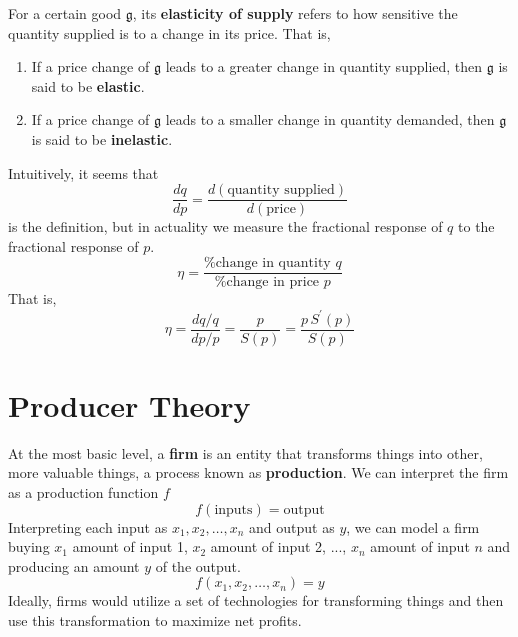 \documentclass{article}
\begin{document}
      \begin{definition}
        \label{def:price-elasticity-of-supply}
        For a certain good $\mathfrak{g}$, its \textbf{elasticity of supply} refers to how sensitive the quantity supplied is to a change in its price. That is, 
        \begin{enumerate}
          \item If a price change of $\mathfrak{g}$ leads to a greater change in quantity supplied, then $\mathfrak{g}$ is said to be \textbf{elastic}. 
          \item If a price change of $\mathfrak{g}$ leads to a smaller change in quantity demanded, then $\mathfrak{g}$ is said to be \textbf{inelastic}. 
        \end{enumerate}
        Intuitively, it seems that 
        \begin{equation}
          \frac{d q}{d p} = \frac{d (\text{quantity supplied})}{d (\text{price})}
        \end{equation}
        is the definition, but in actuality we measure the fractional response of $q$ to the fractional response of $p$. 
        \begin{equation}
          \eta = \frac{\text{\% change in quantity } q}{\text{\% change in price } p}
        \end{equation}
        That is, 
        \begin{equation}
          \eta = \frac{dq/q}{dp/p} = \frac{p}{S(p)} = \frac{p \, S^\prime (p)}{S(p)}
        \end{equation}
      \end{definition}

\section{Producer Theory}

  \begin{definition}
    \label{def:firm-as-a-production-function}
    At the most basic level, a \textbf{firm} is an entity that transforms things into other, more valuable things, a process known as \textbf{production}. We can interpret the firm as a production function $f$ 
    \begin{equation}
      f(\text{inputs}) = \text{output}
    \end{equation}
    Interpreting each input as $x_1, x_2, \ldots, x_n$ and output as $y$, we can model a firm buying $x_1$ amount of input 1, $x_2$ amount of input 2, ..., $x_n$ amount of input $n$ and producing an amount $y$ of the output. 
    \begin{equation}
      f(x_1, x_2, \ldots, x_n) = y
    \end{equation}
    Ideally, firms would utilize a set of technologies for transforming things and then use this transformation to maximize net profits. 
  \end{definition}
\end{document}
